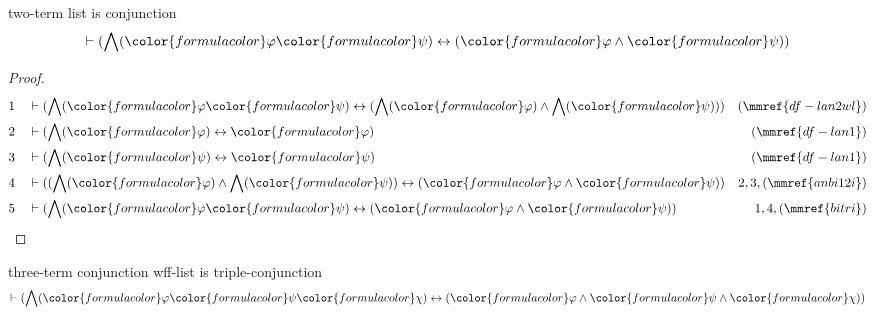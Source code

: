\begin{lemma} two-term list is conjunction
\begin{align}
\vdash ( \bigwedge( {\color{formulacolor}\varphi} {\color{formulacolor}\psi} )
    \leftrightarrow ( {\color{formulacolor}\varphi} \wedge
    {\color{formulacolor}\psi} ) )\label{bl.an2wl}
\end{align}
\end{lemma}

\begin{proof}
\begin{align}
  1 && & \vdash ( \bigwedge( {\color{formulacolor}\varphi}
      {\color{formulacolor}\psi} ) \leftrightarrow (
      \bigwedge( {\color{formulacolor}\varphi} ) \wedge
      \bigwedge( {\color{formulacolor}\psi} ) )
      )&(\mmref{df-lan2wl})\notag
  \\ 2 && & \vdash ( \bigwedge( {\color{formulacolor}\varphi} ) \leftrightarrow
      {\color{formulacolor}\varphi}
      )&(\mmref{df-lan1})\notag
  \\ 3 && & \vdash ( \bigwedge( {\color{formulacolor}\psi} ) \leftrightarrow
      {\color{formulacolor}\psi} )&(\mmref{df-lan1})\notag
  \\ 4 && & \vdash ( ( \bigwedge( {\color{formulacolor}\varphi} ) \wedge
      \bigwedge( {\color{formulacolor}\psi} ) )
      \leftrightarrow ( {\color{formulacolor}\varphi}
      \wedge {\color{formulacolor}\psi} )
      )&2,3,(\mmref{anbi12i})\notag
  \\ 5 && & \vdash ( \bigwedge( {\color{formulacolor}\varphi}
      {\color{formulacolor}\psi} ) \leftrightarrow (
      {\color{formulacolor}\varphi} \wedge
      {\color{formulacolor}\psi} )
      )&1,4,(\mmref{bitri})\notag
\end{align}
\end{proof}

\begin{lemma} three-term conjunction wff-list is
triple-conjunction
\begin{align}
\vdash ( \bigwedge( {\color{formulacolor}\varphi} {\color{formulacolor}\psi}
    {\color{formulacolor}\chi} ) \leftrightarrow (
    {\color{formulacolor}\varphi} \wedge {\color{formulacolor}\psi} \wedge
    {\color{formulacolor}\chi} ) )\label{bl.an3wl}
\end{align}
\end{lemma}

